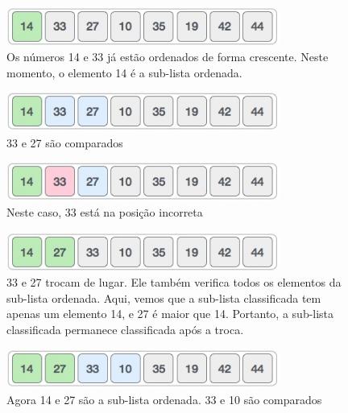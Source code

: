 \begin{figure}[!htb]
\centering
\includegraphics[width=9cm]{img/insertion_sort_3.jpg}
\caption{Os números 14 e 33 já estão ordenados de forma crescente. Neste momento, o elemento 14 é a sub-lista ordenada.}
\label{fig:insertion3}
\end{figure}

\begin{figure}[!htb]
\centering
\includegraphics[width=9cm]{img/insertion_sort_4.jpg}
\caption{33 e 27 são comparados}
\label{fig:insertion4}
\end{figure}

\begin{figure}[!htb]
\centering
\includegraphics[width=9cm]{img/insertion_sort_5.jpg}
\caption{Neste caso, 33 está na posição incorreta}
\label{fig:insertion5}
\end{figure}

\begin{figure}[!htb]
\centering
\includegraphics[width=9cm]{img/insertion_sort_6.jpg}
\caption{33 e 27 trocam de lugar. Ele também verifica todos os elementos da sub-lista ordenada. Aqui, vemos que a sub-lista classificada tem apenas um elemento 14, e 27 é maior que 14. Portanto, a sub-lista classificada permanece classificada após a troca. }
\label{fig:insertion6}
\end{figure}

\begin{figure}[!htb]
\centering
\includegraphics[width=9cm]{img/insertion_sort_7.jpg}
\caption{Agora 14 e 27 são a sub-lista ordenada. 33 e 10 são comparados}
\label{fig:insertion7}
\end{figure}

